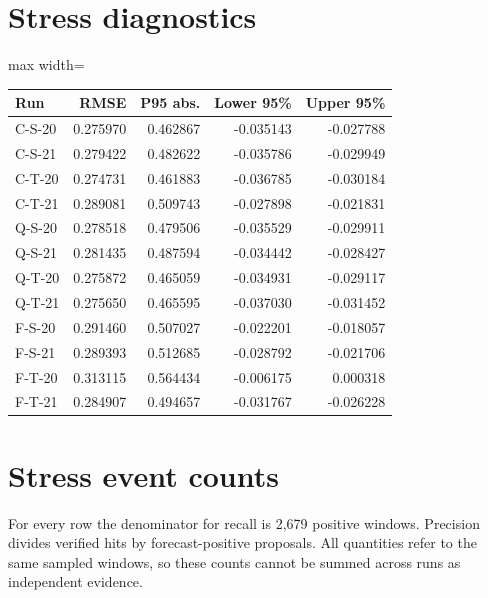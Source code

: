 \documentclass[11pt,oneside,openany]{book}
\begin{document}
\section*{Stress diagnostics}
\begin{center}\footnotesize\sffamily\setlength{\tabcolsep}{3.5pt}\renewcommand{\arraystretch}{1.2}
\begin{adjustbox}{max width=\linewidth}\begin{tabular}{@{}lrrrr@{}}\toprule
Run & RMSE & P95 abs. & Lower 95\% & Upper 95\% \\ \midrule
C-S-20 & 0.275970 & 0.462867 & -0.035143 & -0.027788 \\
C-S-21 & 0.279422 & 0.482622 & -0.035786 & -0.029949 \\
C-T-20 & 0.274731 & 0.461883 & -0.036785 & -0.030184 \\
C-T-21 & 0.289081 & 0.509743 & -0.027898 & -0.021831 \\
Q-S-20 & 0.278518 & 0.479506 & -0.035529 & -0.029911 \\
Q-S-21 & 0.281435 & 0.487594 & -0.034442 & -0.028427 \\
Q-T-20 & 0.275872 & 0.465059 & -0.034931 & -0.029117 \\
Q-T-21 & 0.275650 & 0.465595 & -0.037030 & -0.031452 \\
F-S-20 & 0.291460 & 0.507027 & -0.022201 & -0.018057 \\
F-S-21 & 0.289393 & 0.512685 & -0.028792 & -0.021706 \\
F-T-20 & 0.313115 & 0.564434 & -0.006175 & 0.000318 \\
F-T-21 & 0.284907 & 0.494657 & -0.031767 & -0.026228 \\
\bottomrule\end{tabular}\end{adjustbox}\end{center}
\section*{Stress event counts}
For every row the denominator for recall is 2,679 positive windows. Precision divides verified hits by forecast-positive proposals. All quantities refer to the same sampled windows, so these counts cannot be summed across runs as independent evidence.
\end{document}

